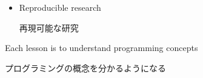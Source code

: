 \documentclass{beamer}
\begin{document}
\begin{frame}
\begin{itemize}
   \item Reproducible research \\ \begin{CJK}{UTF8}{min}再現可能な研究\end{CJK}
   
  \end{itemize}
  
       Each lesson is to understand programming concepts \\ \begin{CJK}{UTF8}{min} プログラミングの概念を分かるようになる\end{CJK}
  
  \end{frame}
      \begin{frame}

\begin{center}
  \end{center}

\end{frame}
\end{document}
